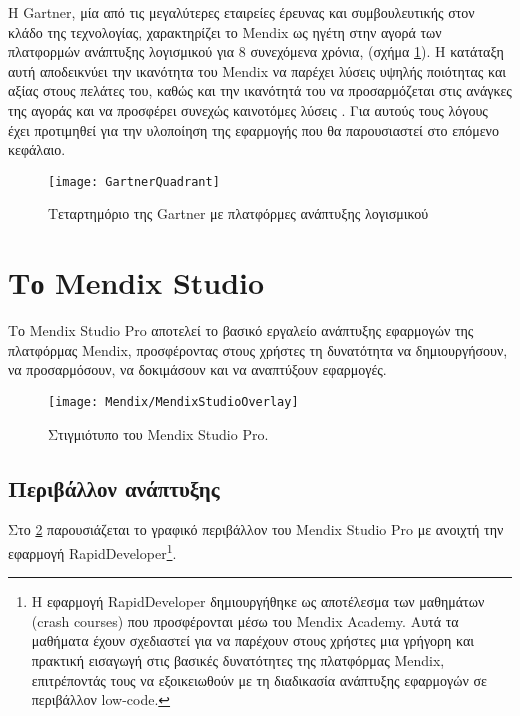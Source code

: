         Η Gartner, μία από τις μεγαλύτερες εταιρείες έρευνας και συμβουλευτικής στον κλάδο της τεχνολογίας, χαρακτηρίζει το Mendix ως ηγέτη στην αγορά των πλατφορμών ανάπτυξης λογισμικού για 8 συνεχόμενα χρόνια, (σχήμα \ref{fig:GartnerQuadrant}). Η κατάταξη αυτή αποδεικνύει την ικανότητα του Mendix να παρέχει λύσεις υψηλής ποιότητας και αξίας στους πελάτες του, καθώς και την ικανότητά του να προσαρμόζεται στις ανάγκες της αγοράς και να προσφέρει συνεχώς καινοτόμες λύσεις \cite{mendixGartnerQuadrant}. Για αυτούς τους λόγους έχει προτιμηθεί για την υλοποίηση της εφαρμογής που θα παρουσιαστεί στο επόμενο κεφάλαιο.

            \begin{figure}[h!] \noindent \centering
                \texttt{[image: GartnerQuadrant]}
                \caption{\centering Τεταρτημόριο της Gartner με πλατφόρμες ανάπτυξης λογισμικού \cite{mendixGartnerQuadrant}}
                \label{fig:GartnerQuadrant}
            \end{figure}

    \section{Το Mendix Studio}
        Το Mendix Studio Pro αποτελεί το βασικό εργαλείο ανάπτυξης εφαρμογών της πλατφόρμας Mendix, προσφέροντας στους χρήστες τη δυνατότητα να δημιουργήσουν, να προσαρμόσουν, να δοκιμάσουν και να αναπτύξουν εφαρμογές.

        \begin{figure}[h!] \noindent \centering
            \texttt{[image: Mendix/MendixStudioOverlay]}
            \caption{\centering Στιγμιότυπο του Mendix Studio Pro.}
            \label{fig:MendixStudioOverlay}
        \end{figure}

        \subsection{Περιβάλλον ανάπτυξης}
        Στο \ref{fig:MendixStudioOverlay} παρουσιάζεται το γραφικό περιβάλλον του Mendix Studio Pro με ανοιχτή την εφαρμογή RapidDeveloper\footnote{Η εφαρμογή RapidDeveloper δημιουργήθηκε ως αποτέλεσμα των μαθημάτων (crash courses) που προσφέρονται μέσω του Mendix Academy. Αυτά τα μαθήματα έχουν σχεδιαστεί για να παρέχουν στους χρήστες μια γρήγορη και πρακτική εισαγωγή στις βασικές δυνατότητες της πλατφόρμας Mendix, επιτρέποντάς τους να εξοικειωθούν με τη διαδικασία ανάπτυξης εφαρμογών σε περιβάλλον low-code.}.


